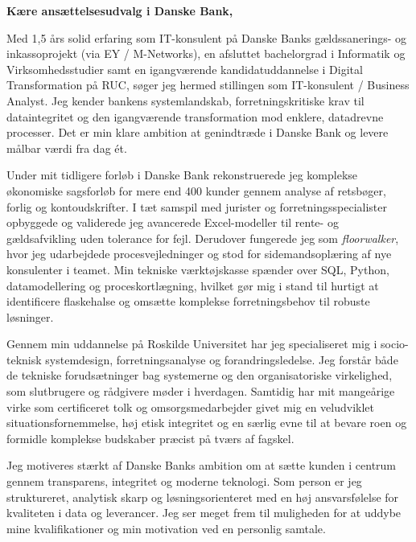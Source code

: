 \documentclass[10pt,a4paper]{article}
\begin{document}
\vspace{14pt}

\textbf{Kære ansættelsesudvalg i Danske Bank,}

Med 1,5 års solid erfaring som IT-konsulent på Danske Banks gældssanerings- og inkassoprojekt (via EY / M-Networks), en afsluttet bachelorgrad i Informatik og Virksomhedsstudier samt en igangværende kandidatuddannelse i Digital Transformation på RUC, søger jeg hermed stillingen som IT-konsulent / Business Analyst. Jeg kender bankens systemlandskab, forretningskritiske krav til dataintegritet og den igangværende transformation mod enklere, datadrevne processer. Det er min klare ambition at genindtræde i Danske Bank og levere målbar værdi fra dag ét.

Under mit tidligere forløb i Danske Bank rekonstruerede jeg komplekse økonomiske sagsforløb for mere end 400 kunder gennem analyse af retsbøger, forlig og kontoudskrifter. I tæt samspil med jurister og forretningsspecialister opbyggede og validerede jeg avancerede Excel-modeller til rente- og gældsafvikling uden tolerance for fejl. Derudover fungerede jeg som \textit{floorwalker}, hvor jeg udarbejdede procesvejledninger og stod for sidemandsoplæring af nye konsulenter i teamet. Min tekniske værktøjskasse spænder over SQL, Python, datamodellering og proceskortlægning, hvilket gør mig i stand til hurtigt at identificere flaskehalse og omsætte komplekse forretningsbehov til robuste løsninger.

Gennem min uddannelse på Roskilde Universitet har jeg specialiseret mig i socio-teknisk systemdesign, forretningsanalyse og forandringsledelse. Jeg forstår både de tekniske forudsætninger bag systemerne og den organisatoriske virkelighed, som slutbrugere og rådgivere møder i hverdagen. Samtidig har mit mangeårige virke som certificeret tolk og omsorgsmedarbejder givet mig en veludviklet situationsfornemmelse, høj etisk integritet og en særlig evne til at bevare roen og formidle komplekse budskaber præcist på tværs af fagskel.

Jeg motiveres stærkt af Danske Banks ambition om at sætte kunden i centrum gennem transparens, integritet og moderne teknologi. Som person er jeg struktureret, analytisk skarp og løsningsorienteret med en høj ansvarsfølelse for kvaliteten i data og leverancer. Jeg ser meget frem til muligheden for at uddybe mine kvalifikationer og min motivation ved en personlig samtale.
\end{document}
